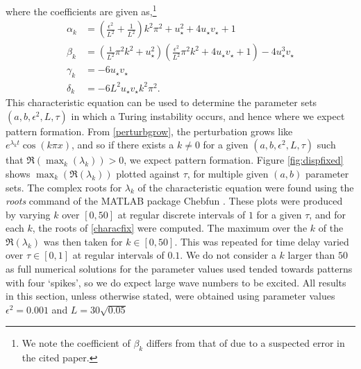 where the coefficients are given as,\footnote{We note the coefficient of $\beta_k$ differs from that of \cite{yigaffneyli} due to a suspected error in the cited paper.}
\begin{align}
\alpha_k&=\left(\frac{\epsilon^2}{L^2}+\frac{1}{L^2}\right)k^2\pi^2+u_\star^2+4u_\star v_\star+1\\
\beta_k&=\left(\frac{1}{L^2}\pi^2k^2+u_\star^2\right)\left(\frac{\epsilon^2}{L^2}\pi^2k^2+4u_\star v_\star+1\right)-4u_\star^3v_\star\\
\gamma_k&=-6u_\star v_\star\\
\delta_k&=-{6}{L^2}u_\star v_\star k^2\pi^2.
\end{align}
This characteristic equation can be used to determine the parameter sets $(a,b,\epsilon^2,L,\tau)$ in which a Turing instability occurs, and hence where we expect pattern formation. From \eqref{perturbgrow}, the perturbation grows like $e^{\lambda_k t}\cos(k\pi x)$, and so if there exists a $k\neq0$ for a given $(a,b,\epsilon^2,L,\tau)$ such that $\Re(\max_k(\lambda_k))>0$, we expect pattern formation. Figure \ref{fig:dispfixed} shows $\max_k(\Re(\lambda_k))$ plotted against $\tau$, for multiple given $(a,b)$ parameter sets. The complex roots for $\lambda_k$ of the characteristic equation were found using the \emph{roots} command of the MATLAB package Chebfun \cite{chebfun}. These plots were produced by varying $k$ over $[0,50]$ at regular discrete intervals of $1$ for a given $\tau$, and for each $k$, the roots of \eqref{characfix} were computed. The maximum over the $k$ of the $\Re(\lambda_k)$ was then taken for $k\in[0,50]$. This was repeated for time delay varied over $\tau\in[0,1]$ at regular intervals of $0.1$. We do not consider a $k$ larger than $50$ as full numerical solutions for the parameter values used tended towards patterns with four `spikes', so we do expect large wave numbers to be excited. All results in this section, unless otherwise stated, were obtained using parameter values $\epsilon^2=0.001$ and $L=30\sqrt{0.05}$

